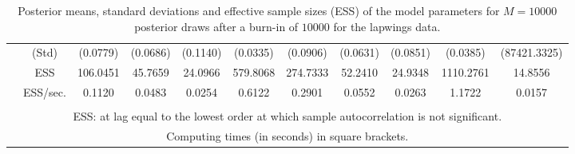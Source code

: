 {{\begin{table}
\begin{tabular}{cc ccc ccc ccc}
 & (Std) 
 & (0.0779)  & (0.0686)  & (0.1140)  & (0.0335)  & (0.0906)  & (0.0631)  & (0.0851)  & (0.0385)  & (87421.3325)  \\  [0.75ex] 
 & ESS 
 & 106.0451  & 45.7659  & 24.0966  & 579.8068  & 274.7333  & 52.2410  & 24.9348  & 1110.2761  & 14.8556  \\  [0.75ex] 
[947.14 s]  & ESS/sec. 
 & 0.1120  & 0.0483  & 0.0254  & 0.6122  & 0.2901  & 0.0552  & 0.0263  & 1.1722  & 0.0157  \\  [1.3ex] 
 \\  \hline 
\multicolumn{11}{p{11cm}}{\footnotesize{ESS: at lag equal to the lowest order at which sample autocorrelation is not significant.}}  \\ 
\multicolumn{11}{p{11cm}}{\footnotesize{Computing times  (in seconds) in square brackets.}}  \\ 
\end{tabular}
 \caption{Posterior means, standard deviations and effective sample sizes (ESS) of the model parameters for $M=10000$ posterior draws after a burn-in of $10000$ for the lapwings data.}
\label{tab:BKM_theta_3}  
\end{table}
}} \normalsize